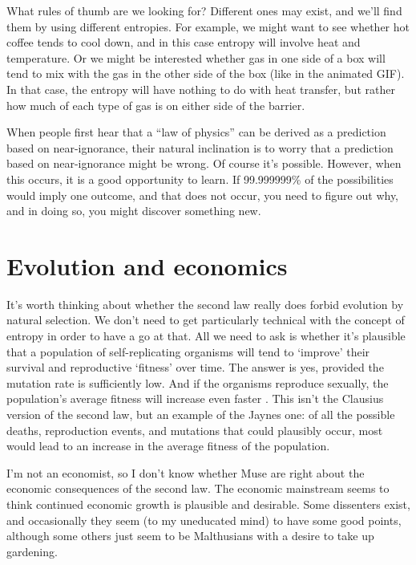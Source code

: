 \documentclass[a4paper, 12pt]{article}
\begin{document}
What rules of thumb are we looking for? Different ones may exist, and
we'll find them by using different entropies. For example, we might want to
see whether hot coffee tends to cool down, and in this case entropy will involve
heat and temperature. Or we might be interested whether gas in one side of
a box will tend to mix with the gas in the other side of the box (like in the
animated GIF). In that case, the entropy will have nothing to do with heat
transfer, but rather how much of each type of gas is on either side of the
barrier.

When people first hear that a ``law of physics'' can be derived as
a prediction based on near-ignorance, their natural inclination is to worry
that a prediction based on near-ignorance might be wrong. Of course it's
possible. However, when this occurs, it is a good opportunity to learn.
If 99.999999\% of the possibilities would imply one outcome, and that
does not occur, you need to figure out why, and in doing so, you might
discover something new.

\section*{Evolution and economics}
It's worth thinking about whether the second law really does forbid evolution
by natural selection. We don't need to get particularly technical with the
concept of entropy in order to have a go at that. All we need to ask is whether
it's plausible that a population of self-replicating organisms will tend to
`improve' their survival and reproductive `fitness' over time.
The answer is yes, provided the mutation rate is sufficiently
low. And if the organisms reproduce sexually, the population's average fitness
will increase even faster \citep{mackay}. This isn't the Clausius version of
the second law, but an example of the Jaynes one: of all the possible deaths,
reproduction events, and mutations that could plausibly occur, most would lead to
an increase in the average fitness of the population.

I'm not an economist, so I don't know whether Muse are right about the economic
consequences of the second law. The economic mainstream seems to think
continued economic growth is plausible and desirable. Some dissenters exist,
and occasionally they seem (to my uneducated mind) to have some good points,
although some others just seem to be Malthusians with a desire to
take up gardening.
\end{document}
